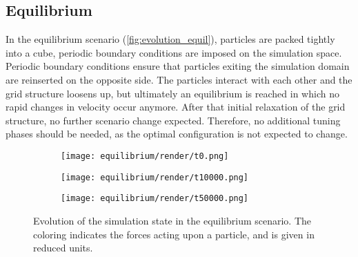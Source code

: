 \newcommand{\fastcolorbarhor}{%
	\centering
	\begin{tikzpicture}
		\node[anchor=east, align=center] at (-0.25cm,-0.25cm) {\si{F^{*}}};
		\pgfplotscolorbardrawstandalone[
			colorbar horizontal,
			colormap name=fast,
			point meta min=0,
			point meta max=50,
			colorbar style={
					width=3cm,
					xtick={0,10,...,50},
					tick align=outside,
					tick pos=top,
					xticklabel pos=top,
				},
		]
	\end{tikzpicture}
}


\subsection{Equilibrium}
\label{subsec:equil}
In the equilibrium scenario (\autoref{fig:evolution_equil}), particles are packed tightly into a cube, periodic boundary conditions are imposed on the simulation space. Periodic boundary conditions ensure that particles exiting the simulation domain are reinserted on the opposite side. The particles interact with each other and the grid structure loosens up, but ultimately an equilibrium is reached in which no rapid changes in velocity occur anymore. After that initial relaxation of the grid structure, no further scenario change expected. Therefore, no additional tuning phases should be needed, as the optimal configuration is not expected to change.

\begin{figure}[htpb]
	\centering
	\begin{subfigure}[c]{.3\textwidth}
		\texttt{[image: equilibrium/render/t0.png]}
	\end{subfigure}%
	\begin{subfigure}[c]{.3\textwidth}
		\texttt{[image: equilibrium/render/t10000.png]}
	\end{subfigure}%
	\begin{subfigure}[c]{.3\textwidth}
		\texttt{[image: equilibrium/render/t50000.png]}
	\end{subfigure}%
	\hfill\begin{subfigure}[c]{.08\textwidth}
		\fastcolorbar
	\end{subfigure}
	\caption{Evolution of the simulation state in the equilibrium scenario. The coloring indicates the forces acting upon a particle, and is given in reduced units.}
	\label{fig:evolution_equil}
\end{figure}


